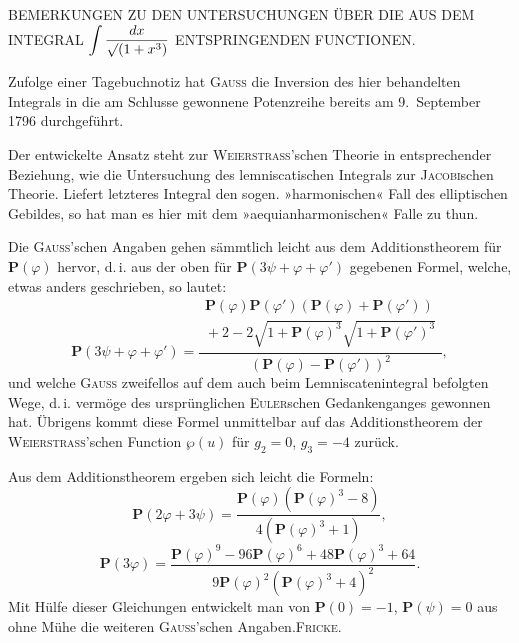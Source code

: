 %
\begin{center}
BEMERKUNGEN ZU DEN UNTERSUCHUNGEN ÜBER DIE AUS DEM INTEGRAL
$\displaystyle\int\frac{dx}{\mathord{\surd}(1+x^3)}$ ENTSPRINGENDEN FUNCTIONEN.
\end{center}

\noindent\hspace*{\parindent}Zufolge einer Tagebuchnotiz hat \textsc{Gauss} die Inversion des hier behandelten
Integrals in die am Schlusse gewonnene Potenzreihe bereits am 9.\ September 1796 durchgeführt.

Der entwickelte Ansatz steht zur \textsc{Weierstrass}’schen Theorie in entsprechender
Beziehung, wie die Untersuchung des lemniscatischen Integrals zur \textsc{Jacobi}schen
Theorie. Liefert letzteres Integral den sogen. »harmonischen« Fall des elliptischen
Gebildes, so hat man es hier mit dem »aequianharmonischen« Falle zu thun.

Die \textsc{Gauss}’schen Angaben gehen sämmtlich leicht aus dem Additionstheorem
für $\boldsymbol{P}(\varphi)$ hervor, d.\,i. aus der oben für
$\boldsymbol{P}(3\psi+\varphi+\varphi')$ gegebenen Formel, welche, etwas anders geschrieben, so lautet:
\[
\boldsymbol{P}(3\psi+\varphi+\varphi')=
\frac{\begin{gathered}\boldsymbol{P}(\varphi)\boldsymbol{P}(\varphi')
(\boldsymbol{P}(\varphi)+\boldsymbol{P}(\varphi'))\\{}
+2-2\sqrt{1+\boldsymbol{P}(\varphi)^3}\sqrt{1+\boldsymbol{P}(\varphi')^3}\end{gathered}}
{(\boldsymbol{P}(\varphi)-\boldsymbol{P}(\varphi'))^2},
\]
\noindent und welche \textsc{Gauss} zweifellos auf dem auch beim Lemniscatenintegral befolgten
Wege, d.\,i. vermöge des ursprünglichen \textsc{Euler}schen Gedankenganges gewonnen hat.
Übrigens kommt diese Formel unmittelbar auf das Additionstheorem der
\textsc{Weierstrass}’schen Function $\wp(u)$ für $g_2=0$, $g_3=-4$ zurück.

Aus dem Additionstheorem ergeben sich leicht die Formeln:
\[
\boldsymbol{P}(2\varphi+3\psi)=\frac{\boldsymbol{P}(\varphi)(\boldsymbol{P}(\varphi)^3-8)}
{4(\boldsymbol{P}(\varphi)^3+1)},
\]
\[
\boldsymbol{P}(3\varphi)=\frac{\boldsymbol{P}(\varphi)^9-96\boldsymbol{P}(\varphi)^6+48\boldsymbol{P}(\varphi)^3+64}
{9\boldsymbol{P}(\varphi)^2(\boldsymbol{P}(\varphi)^3+4)^2}.
\]
\noindent Mit Hülfe dieser Gleichungen entwickelt man von $\boldsymbol{P}(0)=-1$,
$\boldsymbol{P}(\psi)=0$ aus ohne Mühe die weiteren \textsc{Gauss}’schen Angaben.\hfill\textsc{Fricke.}
